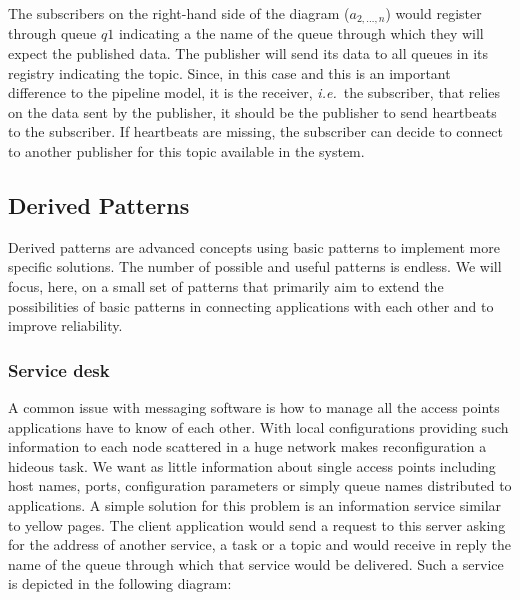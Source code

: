 \documentclass[a4paper]{scrartcl}
\newcommand\ie{\textit{i.e.}}
\newcommand{\connect}[2]{
\draw [->,color=black] (#1) to (#2)
}
\begin{document}
The subscribers on the right-hand side of the diagram 
($a_{2, \dots, n}$)
would register through queue $q1$ indicating
a the name of the queue 
through which they will expect the published data.
The publisher will send its data to all queues
in its registry indicating the topic.
Since, in this case and this is an important difference
to the pipeline model, it is the receiver, \ie\ the subscriber,
that relies on the data sent by the publisher,
it should be the publisher to send heartbeats to the subscriber.
If heartbeats are missing, the subscriber can decide
to connect to another publisher for this topic
available in the system.

\subsection{Derived Patterns}
Derived patterns are advanced concepts
using basic patterns to implement more specific solutions.
The number of possible and useful patterns
is endless. We will focus, here, on a small set
of patterns that primarily aim to extend the 
possibilities of basic patterns 
in connecting applications with each other
and to improve reliability.

\subsubsection{Service desk}\label{subsub:desk}
A common issue with messaging software is
how to manage all the access points 
applications have to know of each other.
With local configurations providing such information
to each node scattered in a huge network
makes reconfiguration a hideous task.
We want as little information about single
access points including host names, ports,
configuration parameters or simply queue names 
distributed to applications.
A simple solution for this problem
is an information service similar to yellow pages.
The client application would 
send a request to this server asking
for the address of another service, a task or a topic
and would receive in reply the name of the queue
through which that service would be delivered.
Such a service is depicted in the following diagram:

\end{document}
